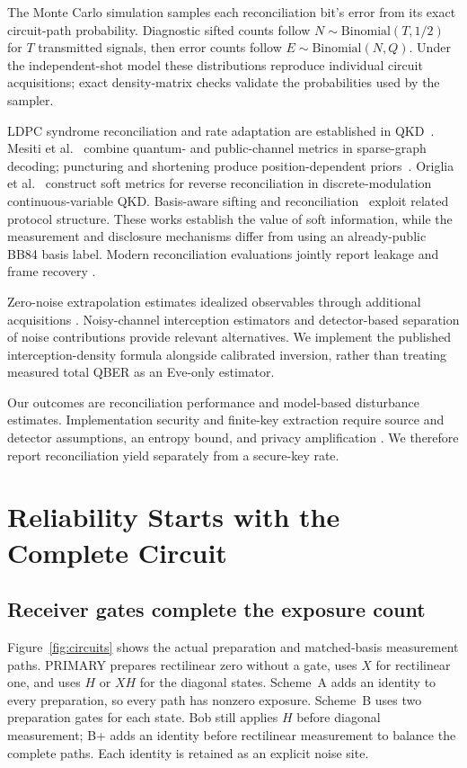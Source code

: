 The Monte Carlo simulation samples each reconciliation bit's error from its exact
circuit-path probability. Diagnostic sifted counts follow $N\sim\mathrm{Binomial}(T,1/2)$
for $T$ transmitted signals, then error counts follow $E\sim\mathrm{Binomial}(N,Q)$.
Under the independent-shot model these distributions reproduce individual circuit
acquisitions; exact density-matrix checks validate the probabilities used by the sampler.

LDPC syndrome reconciliation and rate adaptation are established in
QKD~\cite{elkouss2011,blind2012,martinez2013}. Mesiti et al.~\cite{mesiti2010} combine quantum-
and public-channel metrics in sparse-graph decoding; puncturing and shortening produce
position-dependent priors~\cite{blind2012}. Origlia et al.~\cite{origlia2026} construct soft
metrics for reverse reconciliation in discrete-modulation continuous-variable QKD.
Basis-aware sifting and reconciliation~\cite{martinezmateo2024} exploit related protocol
structure. These works establish the value of soft information, while the measurement and
disclosure mechanisms differ from using an already-public BB84 basis label. Modern
reconciliation evaluations jointly report leakage and frame recovery
\cite{borisov2023,treeviriyanupab2024}.

Zero-noise extrapolation estimates idealized observables through additional acquisitions
\cite{temme2017,li2017,giurgicatiron2020,krebsbach2022}. Noisy-channel interception estimators
\cite{fiorini2024,fiorini2026} and detector-based separation of noise contributions
\cite{qi2007dualdet} provide relevant alternatives. We implement the published
interception-density formula alongside calibrated inversion, rather than treating measured
total QBER as an Eve-only estimator.

Our outcomes are reconciliation performance and model-based disturbance estimates.
Implementation security and finite-key extraction require source and detector assumptions,
an entropy bound, and privacy amplification
\cite{gllp2004,scarani2009,xu2020,fung2009,tomamichel2012,rennerkoenig2005}.
We therefore report reconciliation yield separately from a secure-key rate.

\section{Reliability Starts with the Complete Circuit}
\label{sec:mechanism}
\subsection{Receiver gates complete the exposure count}
Figure~\ref{fig:circuits} shows the actual preparation and matched-basis measurement paths.
PRIMARY prepares rectilinear zero without a gate, uses $X$ for rectilinear one, and uses $H$
or $XH$ for the diagonal states. Scheme~A adds an identity to every preparation, so every
path has nonzero exposure. Scheme~B uses two preparation gates for each state. Bob still
applies $H$ before diagonal measurement; B+ adds an identity before rectilinear measurement
to balance the complete paths. Each identity is retained as an explicit noise site.

